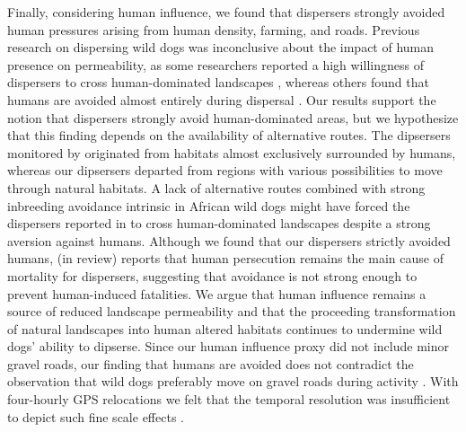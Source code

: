 \documentclass[abstract=on,10pt,a4paper,bibliography=totocnumbered]{scrartcl}
\begin{document}
Finally, considering human influence, we found that dispersers strongly avoided
human pressures arising from human density, farming, and roads. Previous
research on dispersing wild dogs was inconclusive about the impact of human
presence on permeability, as some researchers reported a high willingness of
dispersers to cross human-dominated landscapes \citep{DaviesMostert.2012},
whereas others found that humans are avoided almost entirely during dispersal
\citep{Masenga.2016}. Our results support the notion that dispersers strongly
avoid human-dominated areas, but we hypothesize that this finding depends on the
availability of alternative routes. The dipsersers monitored by
\cite{DaviesMostert.2012} originated from habitats almost exclusively surrounded
by humans, whereas our dipsersers departed from regions with various
possibilities to move through natural habitats. A lack of alternative routes
combined with strong inbreeding avoidance intrinsic in African wild dogs
\citep{McNutt.1996} might have forced the dispersers reported in
\cite{DaviesMostert.2012} to cross human-dominated landscapes despite a strong
aversion against humans. Although we found that our dispersers strictly avoided
humans, \citeauthor{Cozzi.2019} (in review) reports that human persecution
remains the main cause of mortality for dispersers, suggesting that avoidance is
not strong enough to prevent human-induced fatalities. We argue that human
influence remains a source of reduced landscape permeability and that the
proceeding transformation of natural landscapes into human altered habitats
continues to undermine wild dogs' ability to dipserse. Since our human influence
proxy did not include minor gravel roads, our finding that humans are avoided
does not contradict the observation that wild dogs preferably move on gravel
roads during activity \citep{Abrahms.2016}. With four-hourly GPS relocations we
felt that the temporal resolution was insufficient to depict such fine scale
effects \citep{Thurfjell.2014}.
\end{document}
